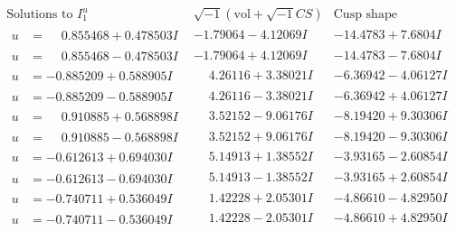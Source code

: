 \documentclass[1p]{elsarticle_modified}
\theoremstyle{definition}
\newcommand{\I}{\sqrt{-1}}
\begin{document}
$$\begin{array}{c|c|c}  
\text{Solutions to }I^u_{1}& \I (\text{vol} + \sqrt{-1}CS) & \text{Cusp shape}\\
 \hline 
\begin{aligned}
u &= \phantom{-}0.855468 + 0.478503 I\end{aligned}
 & -1.79064 - 4.12069 I & -14.4783 + 7.6804 I \\ \hline\begin{aligned}
u &= \phantom{-}0.855468 - 0.478503 I\end{aligned}
 & -1.79064 + 4.12069 I & -14.4783 - 7.6804 I \\ \hline\begin{aligned}
u &= -0.885209 + 0.588905 I\end{aligned}
 & \phantom{-}4.26116 + 3.38021 I & -6.36942 - 4.06127 I \\ \hline\begin{aligned}
u &= -0.885209 - 0.588905 I\end{aligned}
 & \phantom{-}4.26116 - 3.38021 I & -6.36942 + 4.06127 I \\ \hline\begin{aligned}
u &= \phantom{-}0.910885 + 0.568898 I\end{aligned}
 & \phantom{-}3.52152 - 9.06176 I & -8.19420 + 9.30306 I \\ \hline\begin{aligned}
u &= \phantom{-}0.910885 - 0.568898 I\end{aligned}
 & \phantom{-}3.52152 + 9.06176 I & -8.19420 - 9.30306 I \\ \hline\begin{aligned}
u &= -0.612613 + 0.694030 I\end{aligned}
 & \phantom{-}5.14913 + 1.38552 I & -3.93165 - 2.60854 I \\ \hline\begin{aligned}
u &= -0.612613 - 0.694030 I\end{aligned}
 & \phantom{-}5.14913 - 1.38552 I & -3.93165 + 2.60854 I \\ \hline\begin{aligned}
u &= -0.740711 + 0.536049 I\end{aligned}
 & \phantom{-}1.42228 + 2.05301 I & -4.86610 - 4.82950 I \\ \hline\begin{aligned}
u &= -0.740711 - 0.536049 I\end{aligned}
 & \phantom{-}1.42228 - 2.05301 I & -4.86610 + 4.82950 I \\ \hline\begin{aligned}

\end{aligned}
\end{array}$$
\end{document}
